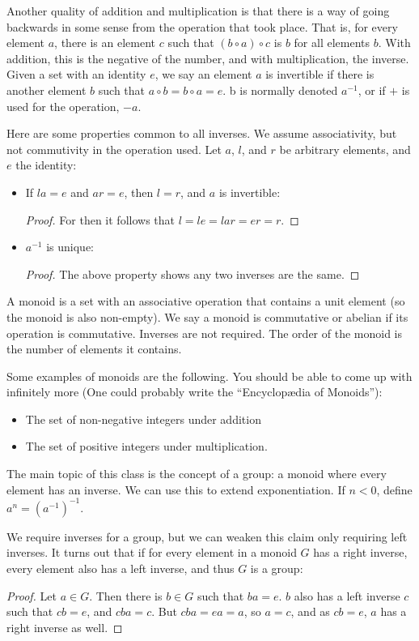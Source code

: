 \documentclass{report}
\begin{document}
Another quality of addition and multiplication is that there is a way of going backwards in some sense from the operation that took place. That is, for every element $a$, there is an element $c$ such that $(b \circ a) \circ c$ is $b$ for all elements $b$. With addition, this is the negative of the number, and with multiplication, the inverse. Given a set with an identity $e$, we say an element $a$ is invertible if there is another element $b$ such that $a \circ b = b \circ a = e$. b is normally denoted $a^{-1}$, or if $+$ is used for the operation, $-a$.

Here are some properties common to all inverses. We assume associativity, but not commutivity in the operation used. Let $a$, $l$, and $r$ be arbitrary elements, and $e$ the identity:
\begin{itemize}
    \item If $la = e$ and $ar = e$, then $l = r$, and $a$ is invertible:
    \begin{proof} For then it follows that $l = le = lar = er = r$. \end{proof}
    \item $a^{-1}$ is unique:
    \begin{proof} The above property shows any two inverses are the same. \end{proof}
\end{itemize}

A monoid is a set with an associative operation that contains a unit element (so the monoid is also non-empty). We say a monoid is commutative or abelian if its operation is commutative. Inverses are not required. The order of the monoid is the number of elements it contains.

Some examples of monoids are the following. You should be able to come up with infinitely more (One could probably write the ``Encyclop\ae dia of Monoids''):
\begin{itemize}
    \item The set of non-negative integers under addition
    \item The set of positive integers under multiplication.
\end{itemize}

The main topic of this class is the concept of a group: a monoid where every element has an inverse. We can use this to extend exponentiation. If $n < 0$, define $a^n = (a^{-1})^{-1}$.

We require inverses for a group, but we can weaken this claim only requiring left inverses. It turns out that if for every element in a monoid $G$ has a right inverse, every element also has a left inverse, and thus $G$ is a group:
\begin{proof}
    Let $a \in G$. Then there is $b \in G$ such that $ba = e$. $b$ also has a left inverse $c$ such that $cb = e$, and $cba = c$. But $cba = ea = a$, so $a = c$, and as $cb = e$, $a$ has a right inverse as well.
\end{proof}
\end{document}
